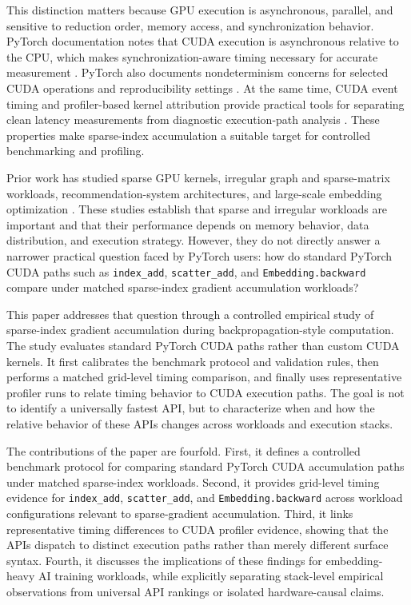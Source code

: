 This distinction matters because GPU execution is asynchronous, parallel, and sensitive to reduction order, memory access, and synchronization behavior. PyTorch documentation notes that CUDA execution is asynchronous relative to the CPU, which makes synchronization-aware timing necessary for accurate measurement \cite{pytorchStableCUDASemantics}. PyTorch also documents nondeterminism concerns for selected CUDA operations and reproducibility settings \cite{pytorchStableReproducibility}. At the same time, CUDA event timing and profiler-based kernel attribution provide practical tools for separating clean latency measurements from diagnostic execution-path analysis \cite{nvidiaCUDAEvents,pytorchStableProfiler,nvidiaNsightCompute}. These properties make sparse-index accumulation a suitable target for controlled benchmarking and profiling.

Prior work has studied sparse GPU kernels, irregular graph and sparse-matrix workloads, recommendation-system architectures, and large-scale embedding optimization \cite{gale2020sparse,wang2016gunrock,huang2020gespmm,gupta2020architectural,acun2021training,liu2024embark}. These studies establish that sparse and irregular workloads are important and that their performance depends on memory behavior, data distribution, and execution strategy. However, they do not directly answer a narrower practical question faced by PyTorch users: how do standard PyTorch CUDA paths such as \texttt{index\_add}, \texttt{scatter\_add}, and \texttt{Embedding.backward} compare under matched sparse-index gradient accumulation workloads?

This paper addresses that question through a controlled empirical study of sparse-index gradient accumulation during backpropagation-style computation. The study evaluates standard PyTorch CUDA paths rather than custom CUDA kernels. It first calibrates the benchmark protocol and validation rules, then performs a matched grid-level timing comparison, and finally uses representative profiler runs to relate timing behavior to CUDA execution paths. The goal is not to identify a universally fastest API, but to characterize when and how the relative behavior of these APIs changes across workloads and execution stacks.

The contributions of the paper are fourfold. First, it defines a controlled benchmark protocol for comparing standard PyTorch CUDA accumulation paths under matched sparse-index workloads. Second, it provides grid-level timing evidence for \texttt{index\_add}, \texttt{scatter\_add}, and \texttt{Embedding.backward} across workload configurations relevant to sparse-gradient accumulation. Third, it links representative timing differences to CUDA profiler evidence, showing that the APIs dispatch to distinct execution paths rather than merely different surface syntax. Fourth, it discusses the implications of these findings for embedding-heavy AI training workloads, while explicitly separating stack-level empirical observations from universal API rankings or isolated hardware-causal claims.

